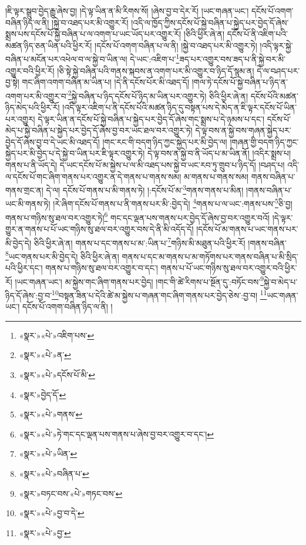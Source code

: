 །ཇི་ལྟར་སྒྲུབ་བྱེད་རྒྱུ་ཞེས་བྱ། །དེ་ལྟ་ཡིན་ན་མི་རིགས་སོ། །ཞེས་བྱ་བ་དེར་རོ། །ཡང་གཞན་ཡང་། དངོས་པོ་འགག་བཞིན་ཉིད་ལ་ནི། །སྐྱེ་བ་འཐད་པར་མི་འགྱུར་རོ། །འདི་ལ་ཁྱོད་ཀྱིས་དངོས་པོ་སྐྱེ་བཞིན་པ་སྐྱེད་པར་བྱེད་དོ་ཞེས་སྨྲས་པས་དངོས་པོ་སྐྱེ་བཞིན་པ་ལ་འགག་པ་ཡང་ཡོད་པར་འགྱུར་རོ། །ཅིའི་ཕྱིར་ཞེ་ན། དངོས་པོ་ནི་འཇིག་པའི་མཚན་ཉིད་ཅན་ཡིན་པའི་ཕྱིར་རོ། །དངོས་པོ་འགག་བཞིན་པ་ལ་ནི། །སྐྱེ་བ་འཐད་པར་མི་འགྱུར་ཏེ། །འདི་ལྟར་སྐྱེ་བཞིན་པ་མངོན་པར་འཕེལ་བ་ལ་སྐྱེ་བ་ཡིན་ལ། དེ་ཡང་:འཇིག་པ་\footnote{«སྣར་»«པེ་»འཇིག་པས་}ཟད་པར་འགྱུར་བས་ཟད་པ་ནི་སྐྱེ་བར་མི་འགྱུར་བའི་ཕྱིར་རོ། །ཅི་སྟེ་སྐྱེ་བཞིན་པའི་གནས་སྐབས་ན་འགག་པར་མི་འགྱུར་བ་ཉིད་དོ་སྙམ་ན། དེ་ལ་བཤད་པར་བྱ་སྟེ། གང་ཞིག་འགག་བཞིན་མ་ཡིན་པ། །དེ་ནི་དངོས་པོར་མི་འཐད་དོ། །གལ་ཏེ་དངོས་པོ་སྐྱེ་བཞིན་པ་ཉིད་ན་འགག་པར་མི་འགྱུར་བ་\footnote{«སྣར་»«པེ་»ན་}སྐྱེ་བཞིན་པ་ཉིད་དངོས་པོ་ཉིད་མ་ཡིན་པར་འགྱུར་ཏེ། ཅིའི་ཕྱིར་ཞེ་ན། དངོས་པོའི་མཚན་ཉིད་མེད་པའི་ཕྱིར་རོ། །འདི་ལྟར་འཇིག་པ་ནི་དངོས་པོའི་མཚན་ཉིད་དུ་བསྟན་པས་དེ་མེད་ན་ཇི་ལྟར་དངོས་པོ་ཡིན་པར་འགྱུར། དེ་ལྟར་ཡིན་ན་དངོས་པོ་སྐྱེ་བཞིན་པ་སྐྱེད་པར་བྱེད་དོ་ཞེས་གང་སྨྲས་པ་དེ་ཉམས་པ་དང་། དངོས་པོ་མེད་པ་སྐྱེ་བཞིན་པ་སྐྱེད་པར་བྱེད་དོ་ཞེས་བྱ་བར་ཡང་ཐལ་བར་འགྱུར་ཏེ། དེ་ལྟ་བས་ན་སྐྱེ་བས་གཞན་སྐྱེད་པར་བྱེད་དོ་ཞེས་བྱ་བ་དེ་ཡང་མི་འཐད་དོ། །གང་རང་གི་བདག་ཉིད་ཀྱང་སྐྱེད་པར་མི་བྱེད་ལ། །གཞན་གྱི་བདག་ཉིད་ཀྱང་སྐྱེད་པར་མི་བྱེད་པ་དེ་སྐྱེ་བ་ཡིན་པར་ཇི་ལྟར་འགྱུར་ཏེ། དེ་ལྟ་བས་ན་སྐྱེ་བ་ནི་ཡོད་པ་མ་ཡིན་ནོ། །འདིར་སྨྲས་པ། གནས་པ་ནི་ཡོད་དེ། དེ་ཡང་དངོས་པོ་མ་སྐྱེས་པ་ལ་མི་འཐད་པས་སྐྱེ་བ་ཡང་རབ་ཏུ་གྲུབ་པ་ཉིད་དོ། །བཤད་པ། འདི་ལ་དངོས་པོ་གང་ཞིག་གནས་པར་འགྱུར་ན་དེ་གནས་པ་གནས་སམ། མ་གནས་པ་གནས་སམ། གནས་བཞིན་པ་གནས་གྲང་ན། དེ་ལ། དངོས་པོ་གནས་པ་མི་གནས་ཏེ། །:དངོས་པོ་མ་\footnote{«སྣར་»«པེ་»དངོས་པོ་མི་}གནས་གནས་པ་མིན། །གནས་བཞིན་པ་ཡང་མི་གནས་ཏེ། །རེ་ཞིག་དངོས་པོ་གནས་པ་ནི་གནས་པར་མི་:བྱེད་དེ། \footnote{«སྣར་»བྱེད་དོ་}གནས་པ་ལ་ཡང་:གནས་པས་\footnote{«སྣར་»«པེ་»གནས་}ཅི་བྱ། གནས་པ་གཉིས་སུ་ཐལ་བར་འགྱུར་ཏེ།\footnote{«སྣར་»«པེ་»ཏེ་གང་དང་ལྡན་པས་གནས་པ་ཞེས་བྱ་བར་འགྱུར་བ་དང་།} གང་དང་ལྡན་པས་གནས་པར་བྱེད་དོ་ཞེས་བྱ་བར་འགྱུར་བའོ། །དེ་ལྟར་གྱུར་ན་གནས་པ་པོ་ཡང་གཉིས་སུ་ཐལ་བར་འགྱུར་བས་དེ་ནི་མི་འདོད་དོ། །དངོས་པོ་མ་གནས་པ་ཡང་གནས་པར་མི་བྱེད་དེ། ཅིའི་ཕྱིར་ཞེ་ན། གནས་པ་དང་གནས་པ་མ་:ཡིན་པ་\footnote{«སྣར་»«པེ་»ཡིན་}གཉིས་མི་མཐུན་པའི་ཕྱིར་རོ། །གནས་བཞིན་\footnote{«སྣར་»«པེ་»བཞིན་པ་}ཡང་གནས་པར་མི་བྱེད་དེ། ཅིའི་ཕྱིར་ཞེ་ན། གནས་པ་དང་མ་གནས་པ་མ་གཏོགས་པར་གནས་བཞིན་པ་མི་སྲིད་པའི་ཕྱིར་དང་། གནས་པ་གཉིས་སུ་ཐལ་བར་འགྱུར་བ་དང་། གནས་པ་པོ་ཡང་གཉིས་སུ་ཐལ་བར་འགྱུར་བའི་ཕྱིར་རོ། །ཡང་གཞན་ཡང་། མ་སྐྱེས་གང་ཞིག་གནས་པར་བྱེད། །གང་གི་ཚེ་རིགས་པ་སྔོན་དུ་:བཏོང་བས་\footnote{«སྣར་»བཏང་བས་«པེ་»གཏང་བས་}སྐྱེ་བ་མེད་པ་ཉིད་དོ་ཞེས་:བྱ་བ་\footnote{«སྣར་»«པེ་»བྱ་བ་དེ་}བསྟན་ཟིན་པ་དེའི་ཚེ་མ་སྐྱེས་པ་གཞན་གང་ཞིག་གནས་པར་བྱེད་ཅེས་:བྱ་བ། \footnote{«སྣར་»«པེ་»བྱ་}ཡང་གཞན་ཡང་། དངོས་པོ་འགག་བཞིན་ཉིད་ལ་ནི། །

